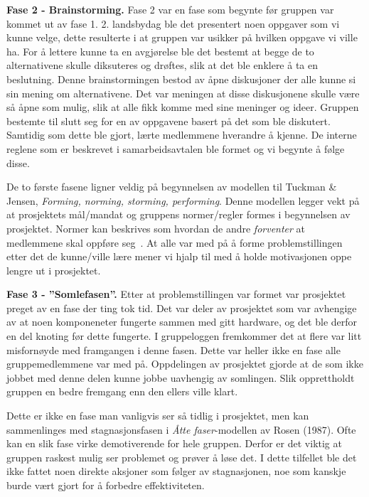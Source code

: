 

\noindent \textbf{\Large Fase 2 - Brainstorming.}
Fase 2 var en fase som begynte før gruppen var kommet ut av fase 1. 
2. landsbydag ble det presentert noen oppgaver som vi kunne velge, dette resulterte i at gruppen var usikker på hvilken oppgave vi ville ha. 
For å lettere kunne ta en avgjørelse ble det bestemt at begge de to alternativene skulle diksuteres og drøftes, slik at det ble enklere å ta en beslutning. 
Denne brainstormingen bestod av åpne diskusjoner der alle kunne si sin mening om alternativene. 
Det var meningen at disse diskusjonene skulle være så åpne som mulig, slik at alle fikk komme med sine meninger og ideer. 
Gruppen bestemte til slutt seg for en av oppgavene basert på det som ble diskutert. 
Samtidig som dette ble gjort, lærte medlemmene hverandre å kjenne. 
De interne reglene som er beskrevet i samarbeidsavtalen ble formet og vi begynte å følge disse. 

De to første fasene ligner veldig på begynnelsen av modellen til Tuckman \& Jensen, \textit{Forming, norming, storming, performing}. 
Denne modellen legger vekt på at prosjektets mål/mandat og gruppens normer/regler formes i begynnelsen av prosjektet. 
Normer kan beskrives som hvordan de andre \textit{forventer} at medlemmene skal oppføre seg~\citep{schwarz}. 
At alle var med på å forme problemstillingen etter det de kunne/ville lære mener vi hjalp til med å holde motivasjonen oppe lengre ut i prosjektet. 
\vspace{\secspace}

\noindent \textbf{\Large Fase 3 - ''Somlefasen''.}
Etter at problemstillingen var formet var prosjektet preget av en fase der ting tok tid. 
Det var deler av prosjektet som var avhengige av at noen komponeneter fungerte sammen med gitt hardware, og det ble derfor en del knoting før dette fungerte.  
I gruppeloggen fremkommer det at flere var litt misfornøyde med framgangen i denne fasen. 
Dette var heller ikke en fase alle gruppemedlemmene var med på. 
Oppdelingen av prosjektet gjorde at de som ikke jobbet med denne delen kunne jobbe uavhengig av somlingen. 
Slik opprettholdt gruppen en bedre fremgang enn den ellers ville klart. 

Dette er ikke en fase man vanligvis ser så tidlig i prosjektet, men kan sammenlinges med stagnasjonsfasen i \textit{Åtte faser}-modellen av Rosen (1987).
Ofte kan en slik fase virke demotiverende for hele gruppen. 
Derfor er det viktig at gruppen raskest mulig ser problemet og prøver å løse det. 
I dette tilfellet ble det ikke fattet noen direkte aksjoner som følger av stagnasjonen, noe som kanskje burde vært gjort for å forbedre effektiviteten. 
\vspace{\secspace}

